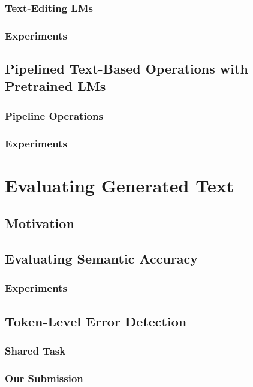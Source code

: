 \documentclass[12pt,notitlepage,a4paper,openright]{report}
\begin{document}
\subsection{Text-Editing LMs}
\label{sec:text-editing}
\subsection{Experiments}
\label{sec:text-editing-exp}
\section{Pipelined Text-Based Operations with Pretrained LMs}
\label{sec:pipeline}
\subsection{Pipeline Operations}
\label{sec:pipeline-ops}
\subsection{Experiments}
\label{sec:pipeline-exp}

\chapter{Evaluating Generated Text}
\label{chap:evaluation}
\section{Motivation}
\label{sec:evalution-mot}
\section{Evaluating Semantic Accuracy}
\label{sec:sem-acc}
\subsection{Experiments}
\label{sec:sem-acc-exp}
\section{Token-Level Error Detection}
\label{sec:eval-token}
\subsection{Shared Task}
\label{sec:eval-st}
\subsection{Our Submission}
\label{sec:eval-ours}
\end{document}
